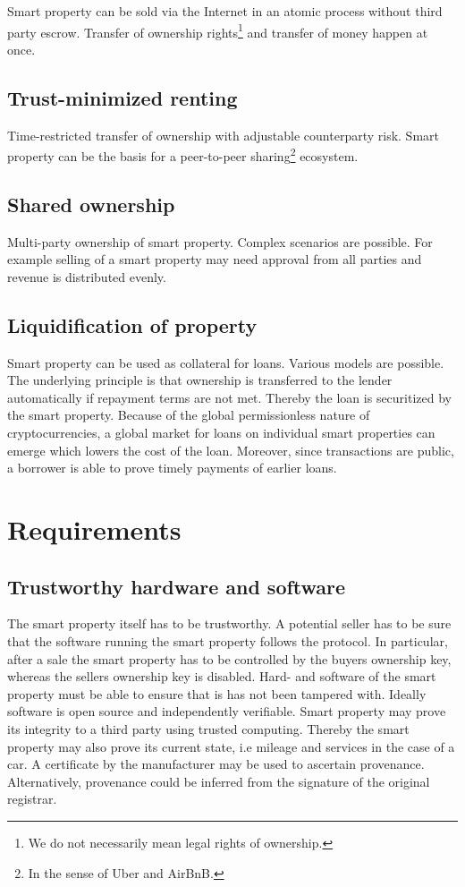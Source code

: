 Smart property can be sold via the Internet in an atomic process without third party escrow. Transfer of ownership rights\footnote{We do not necessarily mean legal rights of ownership.} and transfer of money happen at once. 

\subsection{Trust-minimized renting}

Time-restricted transfer of ownership with adjustable counterparty risk. Smart property can be the basis for a peer-to-peer sharing\footnote{In the sense of Uber and AirBnB.} ecosystem. 

\subsection{Shared ownership}

Multi-party ownership of smart property. Complex scenarios are possible. For example selling of a smart property may need approval from all parties and revenue is distributed evenly.

\subsection{Liquidification of property}

Smart property can be used as collateral for loans. Various models are possible. The underlying principle is that ownership is transferred to the lender automatically if repayment terms are not met. Thereby the loan is securitized by the smart property. Because of the global permissionless nature of cryptocurrencies, a global market for loans on individual smart properties can emerge which lowers the cost of the loan. Moreover, since transactions are public, a borrower is able to prove timely payments of earlier loans. 

\section{Requirements}

\subsection{Trustworthy hardware and software}

The smart property itself has to be trustworthy. A potential seller has to be sure that the software running the smart property follows the protocol. In particular, after a sale the smart property has to be controlled by the buyers ownership key, whereas the sellers ownership key is disabled. Hard- and software of the smart property must be able to ensure that is has not been tampered with. Ideally software is open source and independently verifiable. Smart property may prove its integrity to a third party using trusted computing. Thereby the smart property may also prove its current state, i.e mileage and services in the case of a car. A certificate by the manufacturer may be used to ascertain provenance. Alternatively, provenance could be inferred from the signature of the original registrar.

